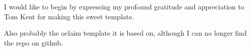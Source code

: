\begin{acknowledgementslong}
I would like to begin by expressing my profound gratitude and appreciation to Tom Kent for making this sweet template.

Also probably the oclaim template it is based on, although I can no longer find the repo on github.


\end{acknowledgementslong}
\newpagenonum
